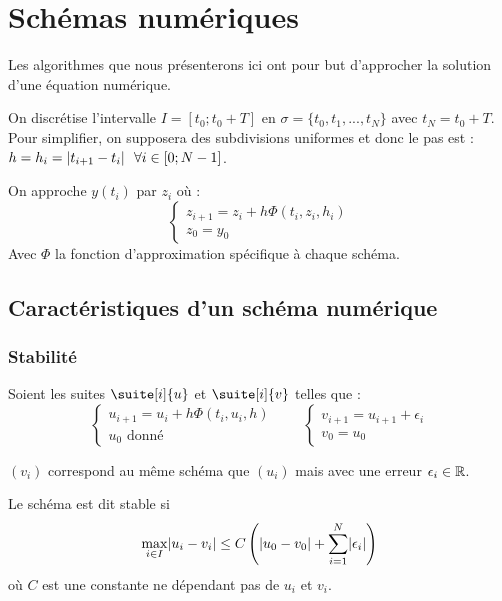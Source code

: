 \section{Schémas numériques}

		Les algorithmes que nous présenterons ici ont pour but d'approcher la solution d'une équation numérique.

		On discrétise l'intervalle $I = [t_0; t_0 +T]$ en $\sigma = \{ t_0, t_1, ..., t_N \}$ avec $t_N = t_0 +T$. Pour simplifier, on supposera des subdivisions uniformes et donc le pas est : $h = h_i = \lvert t_{i+1}-t_i \rvert ~~\forall i \in [0; N-1]$.

		On approche $y(t_i)$ par $z_i$ où :
		\begin{equation}
			\label{eq-3-schema}
			\begin{cases}
				z_{i+1} = z_i + h\Phi(t_i, z_i, h_i) \\
				z_0 = y_0
			\end{cases}
		\end{equation}
		Avec $\Phi$ la fonction d'approximation spécifique à chaque schéma.


	\subsection{Caractéristiques d'un schéma numérique}

		\subsubsection{Stabilité}
			Soient les suites $\suite[i]{u}$ et $\suite[i]{v}$ telles que :
			\begin{equation}
				\label{eq-3-uv}
				\begin{cases}
					u_{i+1} = u_i + h\Phi(t_i,u_i,h)	\\
					u_0 \text{ donné}
				\end{cases}
				\qquad
				\begin{cases}
					v_{i+1} = u_{i+1} + \epsilon_i	\\
					v_0 = u_0
				\end{cases}
			\end{equation}

			$(v_i)$ correspond au même schéma que $(u_i)$ mais avec une erreur $\epsilon_i \in \mathbb{R}$.

			\begin{definition}[Stabilité]
				Le schéma est dit stable si
				\begin{equation}
					\label{eq-3-stable}
					\max_{i\in  I} \lvert u_i - v_i \rvert \leq C \left( \lvert u_0 - v_0 \rvert + \sum_{i=1}^N \lvert \epsilon_i \rvert \right)
				\end{equation}
				où $C$ est une constante ne dépendant pas de $u_i$ et $v_i$.
			\end{definition}

